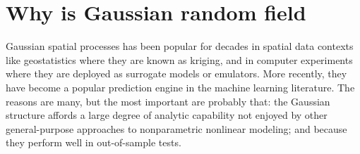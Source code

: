 \documentclass[
12pt, %
a4paper, %
oneside, %
headinclude,footinclude, %
BCOR5mm, %
]{scrartcl}
\title{\normalfont\spacedallcaps{Understanding of spatial problem for Large Datasets}} %
\author{\spacedlowsmallcaps{Yewen Chen}} %
\date{} %
\begin{document}

\setlength{\abovecaptionskip}{0pt}
\setlength{\belowcaptionskip}{10pt}
\renewcommand{\algorithmicrequire}{\textbf{Input:}}  %
\renewcommand{\algorithmicensure}{\textbf{Update step:}} %
\renewcommand{\sectionmark}[1]{\markright{\spacedlowsmallcaps{#1}}} %
\lehead{\mbox{\llap{\small\thepage\kern1em\color{halfgray} \vline}\color{halfgray}\hspace{0.5em}\rightmark\hfil}} %

\pagestyle{scrheadings} %


\maketitle %

\setcounter{tocdepth}{2} %

\tableofcontents %

\listoffigures %

\listoftables %

\newpage
\section{Why is Gaussian random field}
Gaussian spatial processes has been popular for decades in spatial data contexts like geostatistics where they are known as kriging, and in computer experiments where they are deployed as surrogate models or emulators. More recently, they have become a popular prediction engine in the machine learning literature. The reasons are many, but the most important are probably that: the Gaussian structure affords a large degree of analytic capability not enjoyed by other general-purpose approaches to nonparametric nonlinear modeling; and because they perform well in out-of-sample tests.
\end{document}
